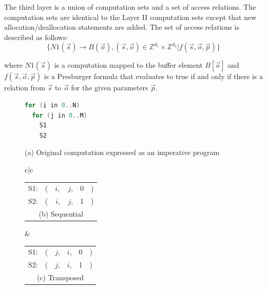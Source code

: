 The third layer is a union of computation sets and a set of access relations.  The computation sets are identical to the Layer II computation sets except that new allocation/deallocation statements are added.  The set of access relations is described as follows:
$$\{N1(\vec{s}) \rightarrow B(\vec{o}), (\vec{s}, \vec{o}) \in \mathbb{Z}^{d_1}\times\mathbb{Z}^{d_2} | f(\vec{s}, \vec{o}, \vec{p})\}$$

\noindent where $N1(\vec{s})$ is a computation mapped to the buffer element $B[\vec{o}]$ and $f(\vec{s}, \vec{o}, \vec{p})$ is a Presburger formula that evaluates to true if and only if there is a relation from $\vec{s}$ to $\vec{o}$ for the given parameters $\vec{p}$.

\begin{figure}
\small

\centering\begin{lstlisting}[language=C,escapechar=@,basicstyle=\linespread{0.9}\small\ttfamily]
for (i in 0..N)
  for (j in 0..M)
    S1
    S2
\end{lstlisting}
(a) Original computation expressed as an imperative program


\begin{tabular}{c|c}
\\\hline
   \begin{tabular}{l@{\hspace{4pt}}r@{\hspace{2pt}}c@{\hspace{2pt}}c@{\hspace{2pt}}c@{\hspace{0pt}}l}
    S1: & ( & $i,$ & $j$, & $0$ & ) \\
    S2: & ( & $i$, & $j$, & 1 & ) \\
    \multicolumn{6}{c}{ (b) Sequential}
   \end{tabular}
     &  
   \begin{tabular}{l@{\hspace{4pt}}r@{\hspace{2pt}}c@{\hspace{2pt}}c@{\hspace{2pt}}c@{\hspace{0pt}}l}
    S1: & ( & $j$, & $i$, & 0 & ) \\
    S2: & ( & $j$, & $i$, & 1 & ) \\
    \multicolumn{6}{c}{ (c) Transposed}
   \end{tabular} \\\hline


\end{tabular}
\end{figure}
